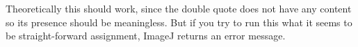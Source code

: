 Theoretically this should work, 
since the double quote does not have any content so its presence should be meaningless. But if you try to run this what it seems to be straight-forward assignment, 
ImageJ returns an error message.